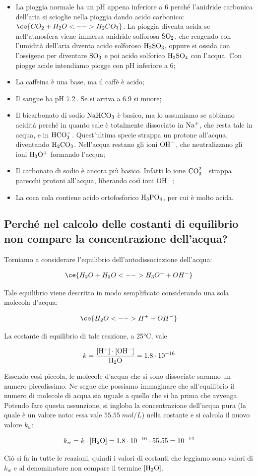 \begin{itemize}
    \item La pioggia normale ha un pH appena inferiore a 6 perché l'anidride carbonica dell'aria si scioglie nella pioggia dando acido carbonico: $\ce{CO_2 + H_2O <--> H_2CO_3}$. La pioggia diventa acida se nell'atmosfera viene immersa anidride solforosa $\rm SO_2$, che reagendo con l'umidità dell'aria diventa acido solforoso $\rm H_2SO_3$, oppure si ossida con l'ossigeno per diventare $\rm SO_3$ e poi acido solforico $\rm H_2SO_4$ con l'acqua. Con piogge acide intendiamo piogge con pH inferiore a 6;
    \item La caffeina è una base, ma il caffè è acido;
    \item Il sangue ha pH 7.2\,. Se si arriva a 6.9 si muore;
    \item Il bicarbonato di sodio $\rm NaHCO_3$ è basico, ma lo assumiamo se abbiamo acidità perché in quanto sale è totalmente dissociato in $\rm Na^+$, che resta tale in acqua, e in $\rm HCO_3^-$. Quest'ultima specie strappa un protone all'acqua, diventando $\rm H_2CO_3$. Nell'acqua restano gli ioni $\rm OH^-$, che neutralizzano gli ioni $\rm H_3O^+$ formando l'acqua;
    \item Il carbonato di sodio è ancora più basico. Infatti lo ione $\rm CO_3^{2-}$ strappa parecchi protoni all'acqua, liberando così ioni $\rm OH^-$;
    \item La coca cola contiene acido ortofosforico $\rm H_3PO_4$, per cui è molto acida.
\end{itemize}

\subsection{Perché nel calcolo delle costanti di equilibrio non compare la concentrazione dell'acqua?}

\vspace{0.2cm}Torniamo a considerare l'equilibrio dell'autodissociazione dell'acqua:

$$\ce{H_2O + H_2O <--> H_3O^+ + OH^-}$$

Tale equilibrio viene descritto in modo semplificato considerando una sola molecola d'acqua:

$$\ce{H_2O <--> H^+ + OH^-}$$

La costante di equilibrio di tale reazione, a 25°C, vale

$$k=\rm \frac{[H^+]\cdot[OH^-]}{H_2O}=1.8 \cdot 10^{-16}$$

Essendo così piccola, le molecole d'acqua che si sono dissociate saranno un numero piccolissimo. Ne segue che possiamo immaginare che all'equilibrio il numero di molecole di acqua sia uguale a quello che si ha prima che avvenga. Potendo fare questa assunzione, si ingloba la concentrazione dell'acqua pura (la quale è un valore noto: essa vale $55.55\;mol/L$) nella costante e si calcola il nuovo valore $k_w$:

$$k_w=k \cdot [\rm H_2O]=1.8 \cdot 10^{-16} \cdot 55.55=10^{-14}$$

Ciò si fa in tutte le reazioni, quindi i valori di costanti che leggiamo sono valori di $k_w$ e al denominatore non compare il termine $\rm [H_2O]$.
